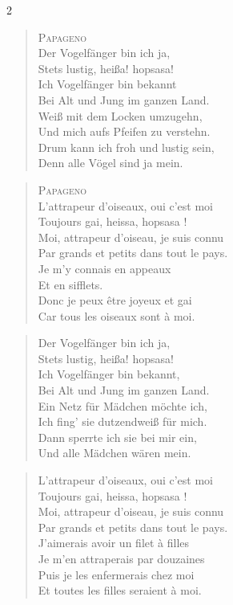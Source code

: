 \documentclass[a4paper,12pt]{article}
\newcommand\chunks[2]{%
\begin{leftcolumn*}\begin{otherlanguage}{german}%
{#1}%
\end{otherlanguage}\end{leftcolumn*}%
\begin{rightcolumn}\begin{otherlanguage}{french}%
{#2}%
\end{otherlanguage}\end{rightcolumn}%
}
\begin{document}
\begin{paracol}{2}
  \chunks{\begin{verse}
          \textsc{Papageno}\\[\medskipamount]
          Der Vogelfänger bin ich ja,\\
          Stets lustig, heißa! hopsasa!\\
          Ich Vogelfänger bin bekannt\\
          Bei Alt und Jung im ganzen Land.\\
          Weiß mit dem Locken umzugehn,\\
          Und mich aufs Pfeifen zu verstehn.\\
          Drum kann ich froh und lustig sein,\\
          Denn alle Vögel sind ja mein.
          \end{verse}}
         {\begin{verse}
          \textsc{Papageno}\\[\medskipamount]
          L’attrapeur d’oiseaux, oui c’est moi\\
          Toujours gai, heissa, hopsasa !\\
          Moi, attrapeur d’oiseau, je suis connu\\
          Par grands et petits dans tout le pays.\\
          Je m’y connais en appeaux\\
          Et en sifflets.\\
          Donc je peux être joyeux et gai\\
          Car tous les oiseaux sont à moi.
          \end{verse}}

  \chunks{\begin{verse}
          Der Vogelfänger bin ich ja,\\
          Stets lustig, heißa! hopsasa!\\
          Ich Vogelfänger bin bekannt,\\
          Bei Alt und Jung im ganzen Land.\\
          Ein Netz für Mädchen möchte ich,\\
          Ich fing’ sie dutzendweiß für mich.\\
          Dann sperrte ich sie bei mir ein,\\
          Und alle Mädchen wären mein.
          \end{verse}}
         {\begin{verse}
          L’attrapeur d’oiseaux, oui c’est moi\\
          Toujours gai, heissa, hopsasa !\\
          Moi, attrapeur d’oiseau, je suis connu\\
          Par grands et petits dans tout le pays.\\
          J’aimerais avoir un filet à filles\\
          Je m’en attraperais par douzaines\\
          Puis je les enfermerais chez moi\\
          Et toutes les filles seraient à moi.
          \end{verse}}


\end{paracol}
\end{document}

